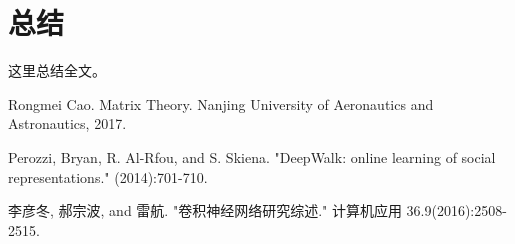 \documentclass[12pt]{article} %
\begin{document}
\section{总结}
这里总结全文。




\newpage

\begin{thebibliography}{9}


  Rongmei Cao.
  Matrix Theory.
  Nanjing University of Aeronautics and Astronautics, 2017.  

  Perozzi, Bryan, R. Al-Rfou, and S. Skiena. "DeepWalk: online learning of social representations." (2014):701-710.

  李彦冬, 郝宗波, and 雷航. "卷积神经网络研究综述." 计算机应用 36.9(2016):2508-2515.

\end{thebibliography}
\end{document}
